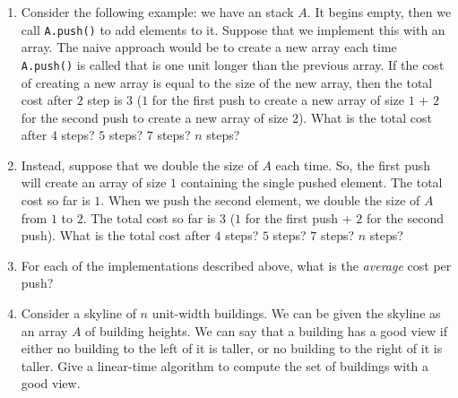 \documentclass{article}
\begin{document}
\begin{enumerate}[(1)]
\item Consider the following example: we have an stack $A$.  It
begins empty, then we call \texttt{A.push()} to add elements to it.
Suppose that we implement this with an array.  The naive approach would
be to create a new array each time \texttt{A.push()} is called that is
one unit longer than the previous array.  If the
cost of creating a new array is equal to the size of the new array, then the total cost after
$2$ step is $3$ ($1$ for the first push to create a new array of size
$1$ + $2$ for the second push to create a new array of size $2$).
What is the total cost after $4$ steps?  $5$ steps? $7$ steps? $n$ steps?
\vspace{1in}
\item Instead, suppose that we double the size of $A$ each time.  So, the
first push will create an array of size $1$ containing the single pushed
element.  The total cost so far is $1$.  When we push the second
element, we double the size of $A$ from $1$ to $2$.
The total cost so far is $3$ ($1$ for the first push + $2$ for the second
push).  What is the total cost after $4$ steps? $5$ steps? $7$ steps?
$n$ steps?
\vspace{1in}
\item For each of the implementations described above, what is the
\emph{average} cost per push?
\pagebreak
\item Consider a skyline of $n$ unit-width buildings.  We can be given the
skyline as an array $A$ of building heights.  We can say that a building
has a good view if either no building to the left of it is taller, or no
building to the right of it is taller.  Give a linear-time algorithm to
compute the set of buildings with a good view.
\end{enumerate}
\end{document}
